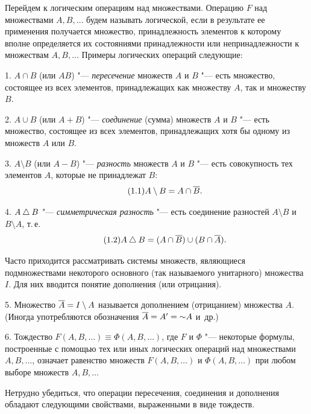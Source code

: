 Перейдем к логическим операциям над множествами. Операцию $F$ над
множествами $A,B,\dots$ будем называть логической, если в результате ее
применения получается множество, принадлежность элементов к которому
вполне определяется их состояниями принадлежности или непринадлежности
к множествам $A,B,\dots$ Примеры логических операций следующие:

1. $A\cap B$ (или $AB$) "--- \emph{пересечение} множеств $A$ и $B$ "--- есть
множество, состоящее из всех элементов, принадлежащих как множеству $A$,
так и множеству $B$.

2. $A\cup B$ (или $A+B$) "--- \emph{соединение} (сумма) множеств $A$ и $B$
"--- есть множество, состоящее из всех элементов, принадлежащих хотя бы
одному из множеств $A$ или $B$.

3. $A\setminus B$ (или $A-B$) "--- \emph{разность} множеств $A$ и $B$ "---
есть совокупность тех элементов $A$, которые не принадлежат $B$:
\begin{equation}\tag{1.1}
A\setminus B=A\cap\overline{B}.
\end{equation}

4. $A\mathbin{\triangle} B$ "--- \emph{симметрическая разность} "--- есть соединение
разностей $A\setminus B$ и $B\setminus A$, т.\,е.
\begin{equation}\tag{1.2}
A\mathbin{\triangle} B=(A\cap\overline{B})\cup(B\cap\overline{A}).
\end{equation}

Часто приходится рассматривать системы множеств, являющиеся подмножествами
некоторого основного (так называемого унитарного) множества $I$. Для них
вводится понятие дополнения (или отрицания).

5. Множество $\overline{A}=I\setminus A$ называется дополнением (отрицанием)
множества $A$. (Иногда употребляются обозначения $\overline{A}=A'={\sim}A$ и~др.)

6. Тождество $F(A,B,\dots)\equiv\Phi(A,B,\dots)$, где $F$ и $\Phi$ "---
некоторые формулы, построенные с помощью тех или иных логических операций
над множествами $A,B,\dots$, означает равенство множеств $F(A,B,\dots)$
и $\Phi(A,B,\dots)$ при любом выборе множеств $A,B,\dots$

Нетрудно убедиться, что операции пересечения, соединения и дополнения
обладают следующими свойствами, выраженными в виде тождеств.

